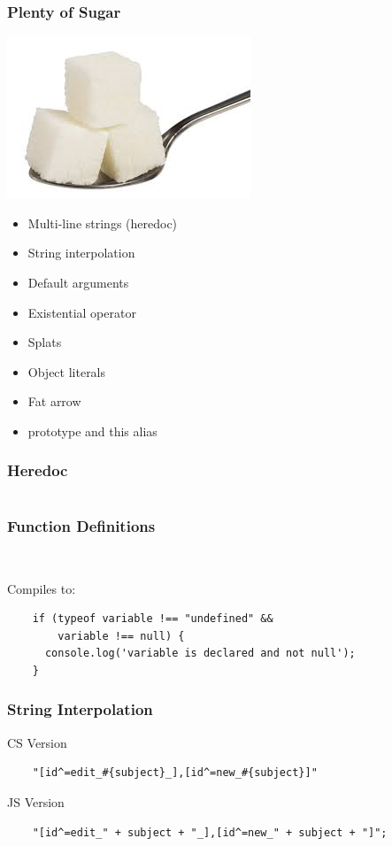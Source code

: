 \documentclass{beamer}
\begin{document}

\begin{frame}
  \frametitle{Plenty of Sugar}
  \includegraphics[scale=.40]{sugar}
%
%
  \begin{itemize}
    \item Multi-line strings (heredoc)
    \item String interpolation
    \item Default arguments
    \item Existential operator
    \item Splats
    \item Object literals
    \item Fat arrow
    \item prototype and this alias
  \end{itemize}
\end{frame}

\begin{frame}
  \frametitle{Heredoc}
  \inputminted{coffeescript}{src/heredoc.coffee}
\end{frame}

\begin{frame}[fragile]
  \frametitle{Function Definitions}

  \begin{verbatim}
    
  \end{verbatim}

  Compiles to:

  \begin{verbatim}
    if (typeof variable !== "undefined" && 
        variable !== null) {
      console.log('variable is declared and not null');
    }
  \end{verbatim}  
\end{frame}


\begin{frame}[fragile]
  \frametitle{String Interpolation}
  CS Version
  \begin{verbatim}
    "[id^=edit_#{subject}_],[id^=new_#{subject}]"
  \end{verbatim}
  JS Version
  \begin{verbatim}
    "[id^=edit_" + subject + "_],[id^=new_" + subject + "]";
  \end{verbatim}  
\end{frame}
\end{document}
